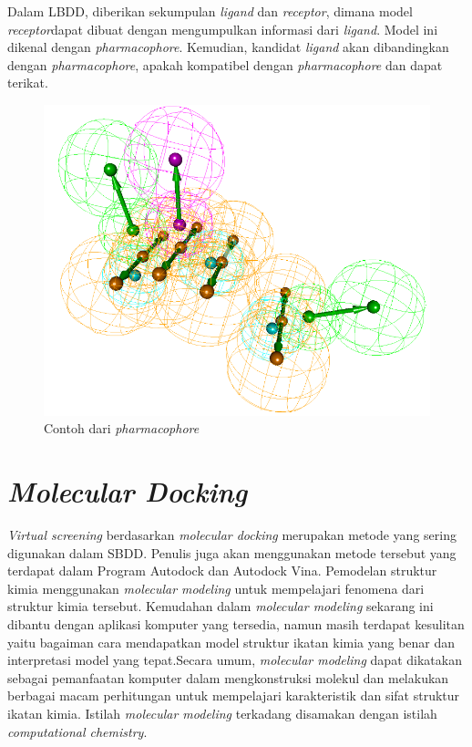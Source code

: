 Dalam LBDD, diberikan sekumpulan \textit{ligand} dan \textit{receptor}, dimana model \textit{receptor}dapat dibuat dengan mengumpulkan informasi dari \textit{ligand}. Model ini dikenal dengan \textit{pharmacophore}. Kemudian, kandidat \textit{ligand} akan dibandingkan dengan \textit{pharmacophore}, apakah kompatibel dengan \textit{pharmacophore} dan dapat terikat.
\begin{figure}
	\centering
	\includegraphics [scale=0.3]{pharmacophore.png}
	\caption{Contoh dari \textit{pharmacophore}}
\end{figure}  

\section{\textit{Molecular Docking}}

\textit{Virtual screening} berdasarkan \textit{molecular docking} merupakan metode yang sering digunakan dalam SBDD. Penulis juga akan menggunakan metode tersebut yang terdapat dalam Program Autodock dan Autodock Vina. Pemodelan struktur kimia menggunakan \textit{molecular modeling} untuk mempelajari fenomena dari struktur kimia tersebut. Kemudahan dalam \textit{molecular modeling} sekarang ini dibantu dengan aplikasi komputer yang tersedia, namun masih terdapat kesulitan yaitu bagaiman cara mendapatkan model struktur ikatan kimia yang benar dan interpretasi model yang tepat.Secara umum, \textit{molecular modeling} dapat dikatakan sebagai pemanfaatan komputer dalam mengkonstruksi molekul dan melakukan berbagai macam perhitungan untuk mempelajari karakteristik dan sifat struktur ikatan kimia. Istilah \textit{molecular modeling} terkadang disamakan dengan istilah \textit{computational chemistry}.

